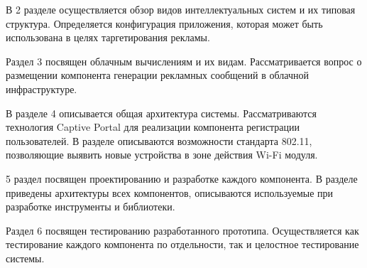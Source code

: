 В 2 разделе осуществляется обзор видов интеллектуальных систем и их типовая структура. Определяется конфигурация приложения, которая может быть использована в целях таргетирования рекламы.

Раздел 3 посвящен облачным вычислениям и их видам. Рассматривается вопрос о размещении компонента генерации рекламных сообщений в облачной инфраструктуре.

В разделе 4 описывается общая архитектура системы. Рассматриваются технология Captive Portal для реализации компонента регистрации пользователей. В разделе описываются возможности стандарта 802.11, позволяющие выявить новые устройства в зоне действия Wi-Fi модуля. 

5 раздел посвящен проектированию и разработке каждого компонента. В разделе приведены архитектуры всех компонентов, описываются используемые при разработке инструменты и библиотеки.

Раздел 6 посвящен тестированию разработанного прототипа. Осуществляется как тестирование каждого компонента по отдельности, так и целостное тестирование системы.
